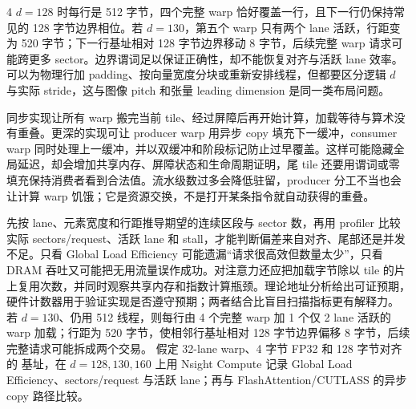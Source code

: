 \begin{solutionexercise}{4}
$d=128$ 时每行是 512 字节，四个完整 warp 恰好覆盖一行，且下一行仍保持常见的 128 字节边界相位。若 $d=130$，第五个 warp 只有两个 lane 活跃，行距变为 520 字节；下一行基址相对 128 字节边界移动 8 字节，后续完整 warp 请求可能跨更多 sector。边界谓词足以保证正确性，却不能恢复对齐与活跃 lane 效率。可以为物理行加 padding、按向量宽度分块或重新安排线程，但都要区分逻辑 $d$ 与实际 stride，这与图像 pitch 和张量 leading dimension 是同一类布局问题。

同步实现让所有 warp 搬完当前 tile、经过屏障后再开始计算，加载等待与算术没有重叠。更深的实现可让 producer warp 用异步 copy 填充下一缓冲，consumer warp 同时处理上一缓冲，并以双缓冲和阶段标记防止过早覆盖。这样可能隐藏全局延迟，却会增加共享内存、屏障状态和生命周期证明，尾 tile 还要用谓词或零填充保持消费者看到合法值。流水级数过多会降低驻留，producer 分工不当也会让计算 warp 饥饿；它是资源交换，不是打开某条指令就自动获得的重叠。

先按 lane、元素宽度和行距推导期望的连续区段与 sector 数，再用 profiler 比较实际 sectors/request、活跃 lane 和 stall，才能判断偏差来自对齐、尾部还是并发不足。只看 Global Load Efficiency 可能遗漏“请求很高效但数量太少”，只看 DRAM 吞吐又可能把无用流量误作成功。对注意力还应把加载字节除以 tile 的片上复用次数，并同时观察共享内存和指数计算瓶颈。理论地址分析给出可证预期，硬件计数器用于验证实现是否遵守预期；两者结合比盲目扫描指标更有解释力。
\variantheading 若 $d=130$、仍用 512 线程，则每行由 4 个完整 warp 加 1 个仅 2 lane 活跃的 warp 加载；行距为 520 字节，使相邻行基址相对 128 字节边界偏移 8 字节，后续完整请求可能拆成两个交易。
\practiceheading 假定 32-lane warp、4 字节 FP32 和 128 字节对齐的  基址，在 $d=128,130,160$ 上用 Nsight Compute 记录 Global Load Efficiency、sectors/request 与活跃 lane；再与 FlashAttention/CUTLASS 的异步 copy 路径比较。
\end{solutionexercise}
